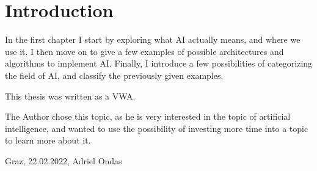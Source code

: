 \chapter{Introduction}
In the first chapter I start by exploring what AI actually means, and where we use it. I then move on to give a few examples of possible architectures and algorithms to implement AI. Finally, I introduce a few possibilities of categorizing the field of AI, and classify the previously given examples.

This thesis was written as a VWA.

The Author chose this topic, as he is very interested in the topic of artificial intelligence, and wanted to use the possibility of investing more time into a topic to learn more about it.

Graz, 22.02.2022, Adriel Ondas